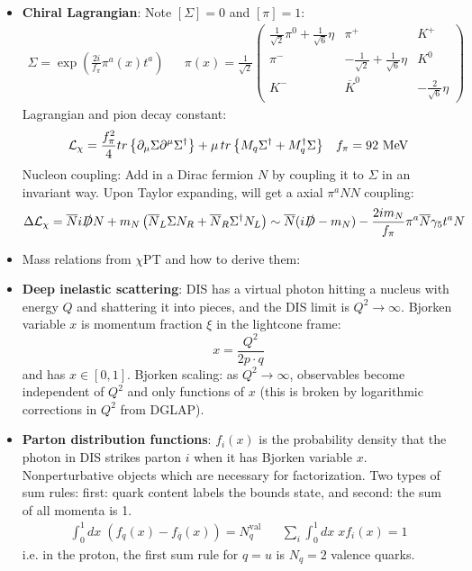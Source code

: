 \documentclass[11pt, oneside]{article}   	%
\theoremstyle{definition}
\numberwithin{equation}{subsection}		%
\begin{document}
\begin{itemize}
	\item \textbf{Chiral Lagrangian}: Note $[\Sigma] = 0$ and $[\pi] = 1$:
	\begin{align}
		\Sigma = \exp\left(\frac{2i}{f_\pi} \pi^a(x) t^a\right) && \pi(x) =\frac{1}{\sqrt 2} \begin{pmatrix} \frac{1}{\sqrt 2} \pi^0 + \frac{1}{\sqrt 6} \eta & \pi^+ & K^+ \\ \pi^- & -\frac{1}{\sqrt 2} + \frac{1}{\sqrt 6} \eta & K^0 \\ K^- & \overline{K}^0 & -\frac{2}{\sqrt 6} \eta  \end{pmatrix}
	\end{align}
	Lagrangian and pion decay constant:
	\begin{align}
		\mathcal L_\chi = \frac{f_\pi^2}{4} tr\left\{\partial_\mu\Sigma \partial^\mu\Sigma^\dagger\right\} + \mu\,tr\left\{M_q\Sigma^\dagger + 
		M_q^\dagger\Sigma\right\} &&
		f_\pi = \textnormal{92 MeV}
	\end{align}
	Nucleon coupling: Add in a Dirac fermion $N$ by coupling it to $\Sigma$ in an invariant way. Upon Taylor expanding, will get a axial $\pi^a NN$ coupling:
	\begin{equation}
		\Delta\mathcal L_\chi = \overline N i\slashed D N + m_N \left(\overline N_L\Sigma N_R + \overline N_R\Sigma^\dagger N_L\right)\sim \overline N(i\slashed D - m_N) 
		- \frac{2i m_N}{f_\pi} \pi^a \overline N \gamma_5 t^a N 
	\end{equation}
	
	\item Mass relations from $\chi$PT and how to derive them:
	
	\item \textbf{Deep inelastic scattering}: DIS has a virtual photon hitting a nucleus with energy $Q$ and shattering it into pieces, and the DIS limit is 
	$Q^2\rightarrow\infty$. Bjorken variable $x$ is momentum fraction $\xi$ in the lightcone frame:
	\begin{equation}
		x = \frac{Q^2}{2p\cdot q}
	\end{equation}
	and has $x\in [0, 1]$. Bjorken scaling: as $Q^2\rightarrow\infty$, observables become independent of $Q^2$ and only functions of $x$ (this is broken 
	by logarithmic corrections in $Q^2$ from DGLAP). 
	
	\item \textbf{Parton distribution functions}: $f_i(x)$ is the probability density that the photon in DIS strikes parton $i$ when it has Bjorken variable $x$. 
	Nonperturbative objects which are necessary for factorization. Two types of sum rules: first: quark content labels the bounds state, and second: 
	the sum of all momenta is 1. 
	\begin{align}
		\int_0^1 dx\; \left(f_q(x) - f_{\overline q}(x)\right) = N_q^\mathrm{val} && \sum_i \int_0^1 dx\; x f_i(x) = 1
	\end{align}
	i.e. in the proton, the first sum rule for $q = u$ is $N_q = 2$ valence quarks.
	

\end{itemize}
\end{document}
